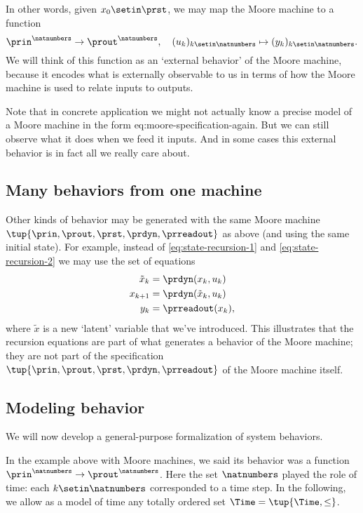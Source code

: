 In other words, given $x_0 \setin \prst$, we may map the Moore machine \label{eq:moore-again} to a function
\begin{equation}
    \prin^\natnumbers \to \prout^\natnumbers,  \quad (u_k)_{k \setin \natnumbers} \mapsto (y_k)_{k \setin \natnumbers}.
\end{equation}
We will think of this function as an `external behavior' of the Moore machine, because it encodes what is externally observable to us in terms of how the Moore machine is used to relate inputs to outputs.

Note that in concrete application we might not actually know a precise model of a Moore machine in the form {eq:moore-specification-again}.
But we can still observe what it does when we feed it inputs.
And in some cases this external behavior is in fact all we really care about.

\subsection{Many behaviors from one machine}

Other kinds of behavior may be generated with the same Moore machine $\tup{\prin, \prout, \prst, \prdyn, \prreadout}$ as above (and using the same initial state).
For example, instead of \cref{eq:state-recursion-1} and \cref{eq:state-recursion-2} we may use the set of equations
\begin{align}
    \tilde x_{k} & = \prdyn(x_k, u_k) \\
    x_{k+1}      & = \prdyn(\tilde x_{k}, u_k) \\
    y_{k}        & = \prreadout(x_{k}),
\end{align}
where $\tilde x$ is a new `latent' variable that we've introduced.
This illustrates that the recursion equations are part of what generates a behavior of the Moore machine; they are not part of the specification $\tup{\prin, \prout, \prst, \prdyn, \prreadout}$ of the Moore machine itself.

\subsection{Modeling behavior}

We will now develop a general-purpose formalization of system behaviors.

In the example above with Moore machines, we said its behavior was a function $\prin^\natnumbers \to \prout^\natnumbers$.
Here the set $\natnumbers$ played the role of time: each $k \setin \natnumbers$ corresponded to a time step.
In the following, we allow as a model of time any totally ordered set $\Time = \tup{\Time, \leq}$.


